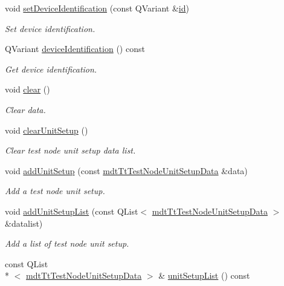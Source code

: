 \begin{DoxyCompactItemize}
void \hyperlink{classmdt_tt_test_node_setup_data_afa479b37e20659b60489d3efd814a757}{set\-Device\-Identification} (const Q\-Variant \&\hyperlink{classmdt_tt_test_node_setup_data_a1e11fe63db0681a9e425da40bf9ec4b9}{id})
\begin{DoxyCompactList}\small\item\em Set device identification. \end{DoxyCompactList}\item 
Q\-Variant \hyperlink{classmdt_tt_test_node_setup_data_a506598b487dcc864d03d3be13dd3c88d}{device\-Identification} () const 
\begin{DoxyCompactList}\small\item\em Get device identification. \end{DoxyCompactList}\item 
void \hyperlink{classmdt_tt_test_node_setup_data_a71e59bc329caae7be7e3a3b3e0135353}{clear} ()
\begin{DoxyCompactList}\small\item\em Clear data. \end{DoxyCompactList}\item 
void \hyperlink{classmdt_tt_test_node_setup_data_a8002d79545e9c45463c3ed763b8271ce}{clear\-Unit\-Setup} ()
\begin{DoxyCompactList}\small\item\em Clear test node unit setup data list. \end{DoxyCompactList}\item 
void \hyperlink{classmdt_tt_test_node_setup_data_a7fcd914f35ddb5138b05dfa04ec1f652}{add\-Unit\-Setup} (const \hyperlink{classmdt_tt_test_node_unit_setup_data}{mdt\-Tt\-Test\-Node\-Unit\-Setup\-Data} \&data)
\begin{DoxyCompactList}\small\item\em Add a test node unit setup. \end{DoxyCompactList}\item 
void \hyperlink{classmdt_tt_test_node_setup_data_aa8b74eb3352c0eb729de74447ea2c351}{add\-Unit\-Setup\-List} (const Q\-List$<$ \hyperlink{classmdt_tt_test_node_unit_setup_data}{mdt\-Tt\-Test\-Node\-Unit\-Setup\-Data} $>$ \&datalist)
\begin{DoxyCompactList}\small\item\em Add a list of test node unit setup. \end{DoxyCompactList}\item 
const Q\-List\\*
$<$ \hyperlink{classmdt_tt_test_node_unit_setup_data}{mdt\-Tt\-Test\-Node\-Unit\-Setup\-Data} $>$ \& \hyperlink{classmdt_tt_test_node_setup_data_a238c66d099bf18741ed436fadee5b52f}{unit\-Setup\-List} () const 

\end{DoxyCompactItemize}

